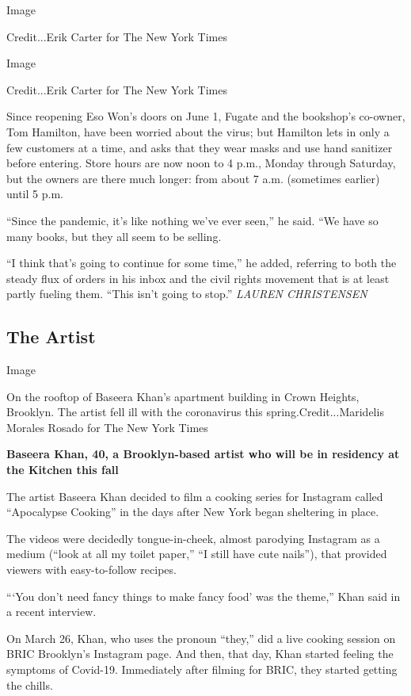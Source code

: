 Image

Credit...Erik Carter for The New York Times

Image

Credit...Erik Carter for The New York Times

Since reopening Eso Won's doors on June 1, Fugate and the bookshop's
co-owner, Tom Hamilton, have been worried about the virus; but Hamilton
lets in only a few customers at a time, and asks that they wear masks
and use hand sanitizer before entering. Store hours are now noon to 4
p.m., Monday through Saturday, but the owners are there much longer:
from about 7 a.m. (sometimes earlier) until 5 p.m.

``Since the pandemic, it's like nothing we've ever seen,'' he said. ``We
have so many books, but they all seem to be selling.

``I think that's going to continue for some time,'' he added, referring
to both the steady flux of orders in his inbox and the civil rights
movement that is at least partly fueling them. ``This isn't going to
stop.'' \emph{LAUREN CHRISTENSEN}

\hypertarget{the-artist}{%
\subsection{The Artist}\label{the-artist}}

Image

On the rooftop of Baseera Khan's apartment building in Crown Heights,
Brooklyn. The artist fell ill with the coronavirus this
spring.Credit...Maridelis Morales Rosado for The New York Times

\textbf{Baseera Khan, 40, a Brooklyn-based artist who will be in
residency at the Kitchen this fall}

The artist Baseera Khan decided to film a cooking series for Instagram
called ``Apocalypse Cooking'' in the days after New York began
sheltering in place.

The videos were decidedly tongue-in-cheek, almost parodying Instagram as
a medium (``look at all my toilet paper,'' ``I still have cute nails''),
that provided viewers with easy-to-follow recipes.

```You don't need fancy things to make fancy food' was the theme,'' Khan
said in a recent interview.

On March 26, Khan, who uses the pronoun ``they,'' did a live cooking
session on BRIC Brooklyn's Instagram page. And then, that day, Khan
started feeling the symptoms of Covid-19. Immediately after filming for
BRIC, they started getting the chills.

